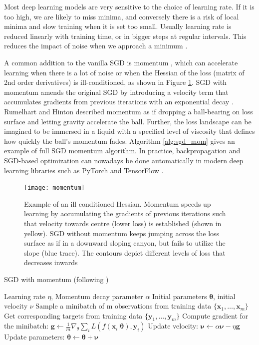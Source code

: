 \documentclass[12pt]{report}
\begin{document}
Most deep learning models are very sensitive to the choice of learning rate. If it is too high, we are likely to miss minima, and conversely there is a risk of local minima and slow training when it is set too small. Usually learning rate is reduced linearly with training time, or in bigger steps at regular intervals. This reduces the impact of noise when we approach a minimum \cite{Goodfellow2016}.

A common addition to the vanilla SGD is momentum \cite{Rumelhart1985}, which can accelerate learning when there is a lot of noise or when the Hessian of the loss (matrix of 2nd order derivatives) is ill-conditioned, as shown in Figure \ref{fig:momentum}. SGD with momentum amends the original SGD by introducing a velocity term that accumulates gradients from previous iterations with an exponential decay \cite{Goodfellow2016}. Rumelhart and Hinton \cite{Rumelhart1985} described momentum as if dropping a ball-bearing on loss surface and letting gravity accelerate the ball. Further, the loss landscape can be imagined to be immersed in a liquid with a specified level of viscosity that defines how quickly the ball's momentum fades. Algorithm \ref{alg:sgd_mom} gives an example of full SGD momentum algorithm. In practice, backpropagation and SGD-based optimization can nowadays be done automatically in modern deep learning libraries such as PyTorch \cite{Paszke2017} and TensorFlow \cite{Abadi2015}. 

\begin{figure}
  \centering
	\texttt{[image: momentum]}
	\caption{Example of an ill conditioned Hessian. Momentum speeds up learning by accumulating the gradients of previous iterations such that velocity towards centre (lower loss) is established (shown in yellow). SGD without momentum keeps jumping across the loss surface as if in a downward sloping canyon, but fails to utilize the slope (blue trace). The contours depict different levels of loss that decreases inwards}
	\label{fig:momentum}
\end{figure}

\begin{algorithm}
  \caption{SGD with momentum (following \cite{Goodfellow2016})} \label{alg:sgd_mom}
\begin{algorithmic}
  \Require Learning rate $\eta$, Momentum decay parameter $\alpha$
  \Require Initial parameters $\pmb{\theta}$, initial velocity $\nu$
  \State Sample a minibatch of m observations from training data $\{\mathbf{x}_1, \dots, \mathbf{x}_m \}$
  \State Get corresponding targets from training data $\{\mathbf{y}_1, \dots, \mathbf{y}_m \}$ 
  \State Compute gradient for the minibatch: $\mathbf{g} \leftarrow \frac{1}{m} \nabla_{\theta}\sum_i L(f(\mathbf{x}_i| \pmb{\theta}), \mathbf{y}_i)$
  \State Update velocity: $\pmb{\nu} \leftarrow \alpha \pmb{\nu} - \eta\mathbf{g}$
  \State Update parameters: $\pmb{\theta} \leftarrow \pmb{\theta} + \pmb{\nu}$
  \EndWhile
\end{algorithmic}
\end{algorithm}
\end{document}
